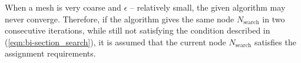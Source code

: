 When a mesh is very coarse and $\epsilon$ -- relatively small, the given algorithm may never converge. Therefore, if the algorithm gives the same node $N_\text{search}$ in two consecutive iterations, while still not satisfying the condition described in (\ref{eqn:bi-section_search}), it is assumed that the current node $N_\text{search}$ satisfies the assignment requirements.